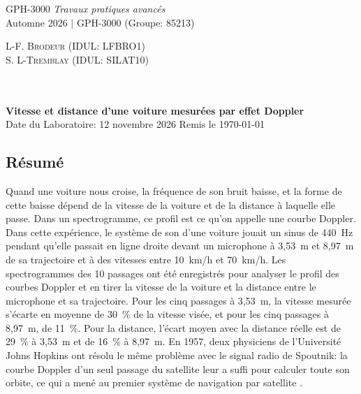 \documentclass[11pt,letterpaper]{article}
\begin{document}
\thispagestyle{empty} %
\begin{center}

\noindent
\begin{minipage}[t]{0.5\textwidth}
\raggedright
{\large GPH-3000 \textit{Travaux pratiques avancés}}\\
{\large Automne 2026 $\vert$ GPH-3000 (Groupe: 85213)}
\end{minipage}%
\begin{minipage}[t]{0.5\textwidth}
\raggedleft
{\large \textsc{L-F. Brodeur (IDUL: LFBRO1)}}\\
{\large \textsc{S. L-Tremblay (IDUL: SILAT10)}}
\end{minipage}
\\~\\
\vspace{1em}
{\Large \textbf{Vitesse et distance d'une voiture mesurées par effet Doppler} }\\
[0.3em]
{\large Date du Laboratoire: 12 novembre 2026 \qquad\qquad\qquad Remis le \today}

\end{center}

\vspace{0.5em}
\subsection*{Résumé}
Quand une voiture nous croise, la fréquence de son bruit baisse, et la forme de cette baisse dépend de la vitesse de la voiture et de la distance à laquelle elle passe. Dans un spectrogramme, ce profil est ce qu'on appelle une courbe Doppler. Dans cette expérience, le système de son d'une voiture jouait un sinus de 440~Hz pendant qu'elle passait en ligne droite devant un microphone à 3,53~m et 8,97~m de sa trajectoire et à des vitesses entre 10~km/h et 70~km/h. Les spectrogrammes des 10 passages ont été enregistrés pour analyser le profil des courbes Doppler et en tirer la vitesse de la voiture et la distance entre le microphone et sa trajectoire. Pour les cinq passages à 3,53~m, la vitesse mesurée s'écarte en moyenne de 30~\% de la vitesse visée, et pour les cinq passages à 8,97~m, de 11~\%. Pour la distance, l'écart moyen avec la distance réelle est de 29~\% à 3,53~m et de 16~\% à 8,97~m. En 1957, deux physiciens de l'Université Johns Hopkins ont résolu le même problème avec le signal radio de Spoutnik: la courbe Doppler d'un seul passage du satellite leur a suffi pour calculer toute son orbite, ce qui a mené au premier système de navigation par satellite \cite{guier}.
\end{document}
